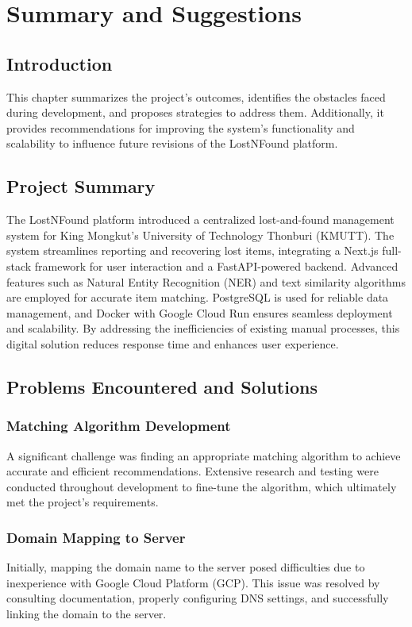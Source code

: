 \chapter{Summary and Suggestions}

\section{Introduction}
This chapter summarizes the project's outcomes, identifies the obstacles faced during development, and proposes strategies to address them. Additionally, it provides recommendations for improving the system's functionality and scalability to influence future revisions of the LostNFound platform.

\section{Project Summary}
The LostNFound platform introduced a centralized lost-and-found management system for King Mongkut's University of Technology Thonburi (KMUTT). The system streamlines reporting and recovering lost items, integrating a Next.js full-stack framework for user interaction and a FastAPI-powered backend. Advanced features such as Natural Entity Recognition (NER) and text similarity algorithms are employed for accurate item matching. PostgreSQL is used for reliable data management, and Docker with Google Cloud Run ensures seamless deployment and scalability. By addressing the inefficiencies of existing manual processes, this digital solution reduces response time and enhances user experience.

\section{Problems Encountered and Solutions}
\subsection{Matching Algorithm Development}
A significant challenge was finding an appropriate matching algorithm to achieve accurate and efficient recommendations. Extensive research and testing were conducted throughout development to fine-tune the algorithm, which ultimately met the project’s requirements.

\subsection{Domain Mapping to Server}
Initially, mapping the domain name to the server posed difficulties due to inexperience with Google Cloud Platform (GCP). This issue was resolved by consulting documentation, properly configuring DNS settings, and successfully linking the domain to the server.


